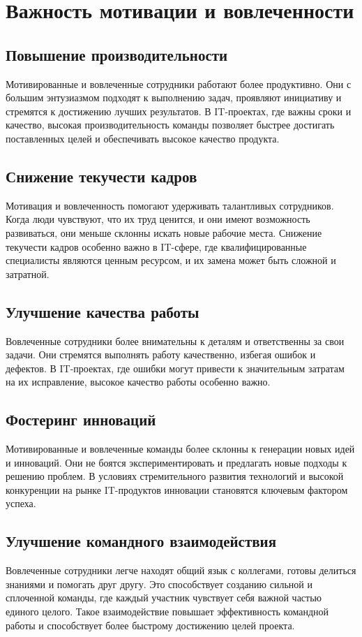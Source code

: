     \section{Важность мотивации и вовлеченности}

    \subsection{Повышение производительности}
    Мотивированные и вовлеченные сотрудники работают более продуктивно. Они с большим энтузиазмом подходят к выполнению задач, проявляют инициативу и стремятся к достижению лучших результатов. В IT-проектах, где важны сроки и качество, высокая производительность команды позволяет быстрее достигать поставленных целей и обеспечивать высокое качество продукта.

    \subsection{Снижение текучести кадров}
    Мотивация и вовлеченность помогают удерживать талантливых сотрудников. Когда люди чувствуют, что их труд ценится, и они имеют возможность развиваться, они меньше склонны искать новые рабочие места. Снижение текучести кадров особенно важно в IT-сфере, где квалифицированные специалисты являются ценным ресурсом, и их замена может быть сложной и затратной.
    
    \subsection{Улучшение качества работы}
    Вовлеченные сотрудники более внимательны к деталям и ответственны за свои задачи. Они стремятся выполнять работу качественно, избегая ошибок и дефектов. В IT-проектах, где ошибки могут привести к значительным затратам на их исправление, высокое качество работы особенно важно.

    \subsection{Фостеринг инноваций}
    Мотивированные и вовлеченные команды более склонны к генерации новых идей и инноваций. Они не боятся экспериментировать и предлагать новые подходы к решению проблем. В условиях стремительного развития технологий и высокой конкуренции на рынке IT-продуктов инновации становятся ключевым фактором успеха.

    \subsection{Улучшение командного взаимодействия}
    Вовлеченные сотрудники легче находят общий язык с коллегами, готовы делиться знаниями и помогать друг другу. Это способствует созданию сильной и сплоченной команды, где каждый участник чувствует себя важной частью единого целого. Такое взаимодействие повышает эффективность командной работы и способствует более быстрому достижению целей проекта.

